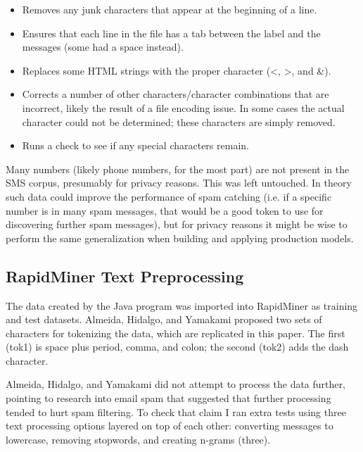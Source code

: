 \documentclass[10pt,journal,compsoc]{IEEEtran}
\begin{document}
\begin{itemize}
\item Removes any junk characters that appear at the beginning of a line.
\item Ensures that each line in the file has a tab between the label and the messages (some had a space instead).
\item Replaces some HTML strings with the proper character (\textless, \textgreater, and \&).
\item Corrects a number of other characters/character combinations that are incorrect, likely the result of a file encoding issue. In some cases the actual character could not be determined; these characters are simply removed.
\item Runs a check to see if any special characters remain.
\end{itemize}

Many numbers (likely phone numbers, for the most part) are not present in the SMS corpus, presumably for privacy reasons. This was left untouched. In theory such data could improve the performance of spam catching (i.e. if a specific number is in many spam messages, that would be a good token to use for discovering further spam messages), but for privacy reasons it might be wise to perform the same generalization when building and applying production models.

\subsection{RapidMiner Text Preprocessing}

The data created by the Java program was imported into RapidMiner as training and test datasets. Almeida, Hidalgo, and Yamakami proposed two sets of characters for tokenizing the data, which are replicated in this paper. The first (tok1) is space plus period, comma, and colon; the second (tok2) adds the dash character. \cite{Paper}

Almeida, Hidalgo, and Yamakami did not attempt to process the data further, pointing to research into email spam that suggested that further processing tended to hurt spam filtering. \cite{Paper} To check that claim I ran extra tests using three text processing options layered on top of each other: converting messages to lowercase, removing stopwords, and creating n-grams (three).
\end{document}
